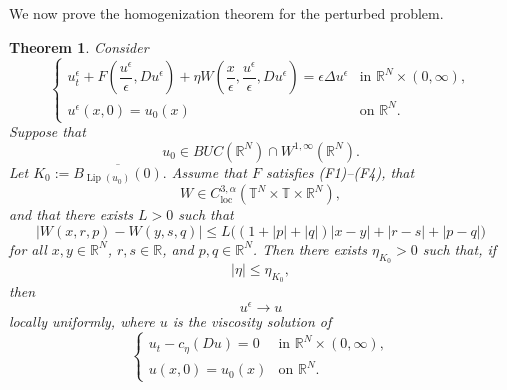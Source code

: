 \documentclass[preprint]{elsarticle}
\newtheorem{result}{\textbf{Theorem}}
\numberwithin{equation}{section}
\begin{document}
We now prove the homogenization theorem for the perturbed problem.
\begin{result}
Consider
\begin{equation}
\begin{cases}
u_t^\epsilon
+
F\left(\dfrac{u^\epsilon}{\epsilon},Du^\epsilon\right)
+
\eta W\left(
\dfrac{x}{\epsilon},
\dfrac{u^\epsilon}{\epsilon},
Du^\epsilon
\right)
=
\epsilon\Delta u^\epsilon
&\text{in }\mathbb R^N\times(0,\infty),
\\[2mm]
u^\epsilon(x,0)=u_0(x)
&\text{on }\mathbb R^N.
\end{cases}
\end{equation}
Suppose that
$$
u_0\in BUC(\mathbb R^N)\cap W^{1,\infty}(\mathbb R^N).
$$
Let $K_0:=\overline{B_{\operatorname{Lip}(u_0)}(0)}.$
Assume that $F$ satisfies \textnormal{(F1)}--\textnormal{(F4)}, that
\[
W\in C_{\mathrm{loc}}^{3,\alpha}
(\mathbb T^N\times\mathbb T\times\mathbb R^N),
\]
and that there exists $L>0$ such that
\[
|W(x,r,p)-W(y,s,q)|
\leq
L\big(
(1+|p|+|q|)|x-y|
+|r-s|
+|p-q|
\big)
\]
for all $x,y\in\mathbb R^N$, $r,s\in\mathbb R$, and
$p,q\in\mathbb R^N$. Then there exists $\eta_{K_0}>0$ such that, if
\begin{equation}
|\eta|\le\eta_{K_0},
\end{equation}
then
$$
u^\epsilon\to u
$$
locally uniformly, where $u$ is the viscosity solution of
\begin{equation}
\begin{cases}
u_t-c_\eta(Du)=0
&\text{in }\mathbb R^N\times(0,\infty),
\\
u(x,0)=u_0(x)
&\text{on }\mathbb R^N.
\end{cases}
\end{equation}
\end{result}
\end{document}
